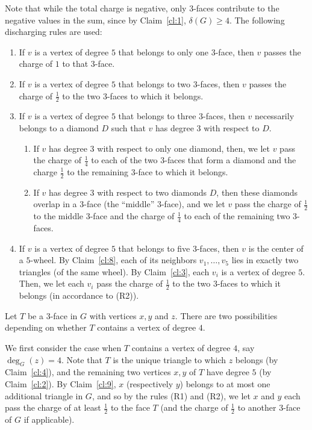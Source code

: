\documentclass[10pt,a4paper]{article}
\begin{document}
Note that while the total charge is negative, only $3$-faces contribute to the negative values in the sum, since by Claim~\ref{cl:1}, $\delta(G)\ge 4$. 
The following discharging rules are used:
\begin{enumerate}[(R1)]
\item If $v$ is a vertex of degree $5$ that belongs to only one $3$-face, then $v$ passes the charge of ${1}$ to that $3$-face. 

\item If $v$ is a vertex of degree $5$ that belongs to two $3$-faces, then $v$ passes the charge of $\frac{1}{2}$ to the two $3$-faces to which it belongs. 

\item If $v$ is a vertex of degree $5$ that belongs to three $3$-faces, then $v$ necessarily belongs to a diamond $D$ such that $v$ has degree $3$ with respect to $D$. 
\begin{enumerate}[(R3.1)]
\item
If $v$ has degree $3$ with respect to only one diamond, then, we let $v$ pass the charge of $\frac{1}{4}$ to each of the two $3$-faces that form a diamond and the charge $\frac{1}{2}$ to the remaining $3$-face to which it belongs. 
\item 
If $v$ has degree $3$ with respect to two diamonds $D$, then these diamonds overlap in a $3$-face (the ``middle'' $3$-face), and we let $v$ pass the charge of $\frac{1}{2}$ to the middle $3$-face and the charge of $\frac{1}{4}$ to each of the remaining two $3$-faces. 
\end{enumerate}
\item If $v$ is a vertex of degree $5$ that belongs to five $3$-faces, then $v$ is the center of a $5$-wheel. 
By Claim~\ref{cl:8}, each of its neighbors $v_1,\ldots, v_5$ lies in exactly two triangles (of the same wheel). By Claim~\ref{cl:3}, each $v_i$ is a vertex of degree $5$. Then, we let each $v_i$ pass the charge of $\frac{1}{2}$ to the two $3$-faces to which it belongs (in accordance to (R2)).  
\end{enumerate}

Let $T$ be a $3$-face in $G$ with vertices $x,y$ and $z$. There are two possibilities depending on whether $T$ contains a vertex of degree $4$. 

We first consider the case when $T$ contains a vertex of degree $4$, say $\deg_G(z)=4$. Note that $T$ is the unique triangle to which $z$ belongs (by Claim~\ref{cl:4}), and the remaining two vertices $x,y$ of $T$ have degree $5$ (by Claim~\ref{cl:2}). By Claim~\ref{cl:9}, $x$ (respectively $y$) belongs to at most one additional triangle in $G$, and so by the rules (R1) and (R2), we let $x$ and $y$ each pass the charge of at least $\frac{1}{2}$ to the face $T$ (and the charge of $\frac{1}{2}$ to another $3$-face of $G$ if applicable). 
\end{document}
